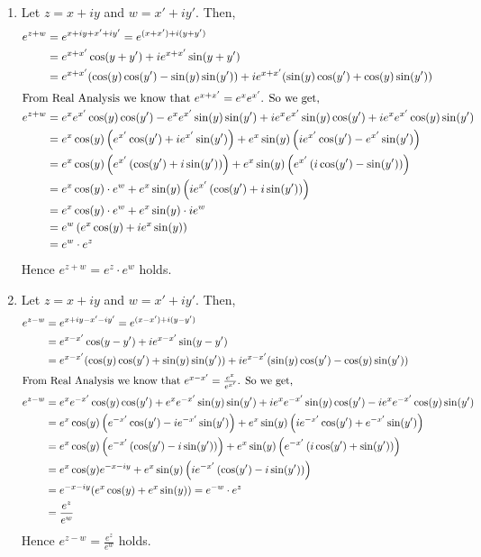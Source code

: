 \documentclass[12pt]{article}
\begin{document}
\begin{solution}
\begin{enumerate}
        \item Let $z = x + iy$ and $w = x' + iy'$. Then, 
        \begin{align*}
            e^{z+w} &= e^{x + iy + x' + iy'} = e^{(x+x') + i(y+y')} \\ 
            &= e^{x+x'} \cos(y+ y') + ie^{x+x'} \sin (y + y') \\
            &=e^{x+x'} (\cos(y)\cos(y') - \sin(y)\sin(y')) + ie^{x+x'} (\sin(y)\cos(y') + \cos(y)\sin(y')) \\ 
        \intertext{From Real Analysis we know that $e^{x+x'} = e^x e^{x'}$. So we get,}
         e^{z+w} &=e^{x}e^{x'} \cos(y)\cos(y') - e^{x}e^{x'}\sin(y)\sin(y') + i e^{x}e^{x'}\sin(y)\cos(y') + ie^{x}e^{x'} \cos(y)\sin(y') \\ 
         &= e^x  \cos(y) \left( e^{x'} \cos(y') + i e^{x'}\sin(y')\right) + e^x\sin(y) \left(i e^{x'} \cos(y') - e^{x'}\sin(y')\right) \\ 
         &= e^x  \cos(y) \left( e^{x'} \left(\cos(y') + i \sin(y')\right)\right) + e^x\sin(y) \left( e^{x'} \left(i\cos(y') - \sin(y')\right)\right) \\ 
         &= e^x\cos(y) \cdot e^w + e^x\sin(y) \left( ie^{x'} \left(\cos(y') + i\sin(y')\right)\right) \\ 
         &= e^x\cos(y) \cdot e^w + e^x\sin(y) \cdot i e^{w} \\
         &= e^w \left(e^x\cos(y) + ie^x\sin(y)\right) \\ 
         &= e^w \cdot e^z 
        \end{align*}
        Hence $e^{z + w} = e^z \cdot e^w$ holds. 

        \item Let $z = x + iy$ and $w = x' + iy'$. Then, 
        \begin{align*}
            e^{z-w} &= e^{x + iy - x' - iy'} = e^{(x-x') + i(y-y')} \\ 
            &= e^{x-x'} \cos(y-y') + ie^{x-x'} \sin (y - y') \\
            &=e^{x-x'} (\cos(y)\cos(y') + \sin(y)\sin(y')) + ie^{x-x'} (\sin(y)\cos(y') - \cos(y)\sin(y')) \\ 
        \intertext{From Real Analysis we know that $e^{x-x'} = \frac{e^x }{e^{x'}}$. So we get,}
         e^{z-w} &=e^{x}e^{-x'} \cos(y)\cos(y') + e^{x}e^{-x'}\sin(y)\sin(y') + i e^{x}e^{-x'}\sin(y)\cos(y') - ie^{x}e^{-x'} \cos(y)\sin(y') \\ 
         &= e^x  \cos(y) \left( e^{-x'} \cos(y') - i e^{-x'}\sin(y')\right) + e^x\sin(y) \left(i e^{-x'} \cos(y') + e^{-x'}\sin(y')\right) \\ 
         &= e^x  \cos(y) \left( e^{-x'} \left(\cos(y') - i \sin(y')\right)\right) + e^x\sin(y) \left( e^{-x'} \left(i\cos(y') + \sin(y')\right)\right) \\ 
         &=e^x  \cos(y) e^{-x-iy} + e^x\sin(y) \left( ie^{-x'} \left(\cos(y') - i \sin(y')\right)\right) \\ 
         &= e^{-x-iy}(e^x\cos(y) + e^x\sin(y)) = e^{-w} \cdot e^z \\
         &= \frac{e^z}{e^w}
        \end{align*}
        Hence $e^{z - w} = \frac{e^z}{e^w}$ holds. 


\end{enumerate}
\end{solution}
\end{document}
